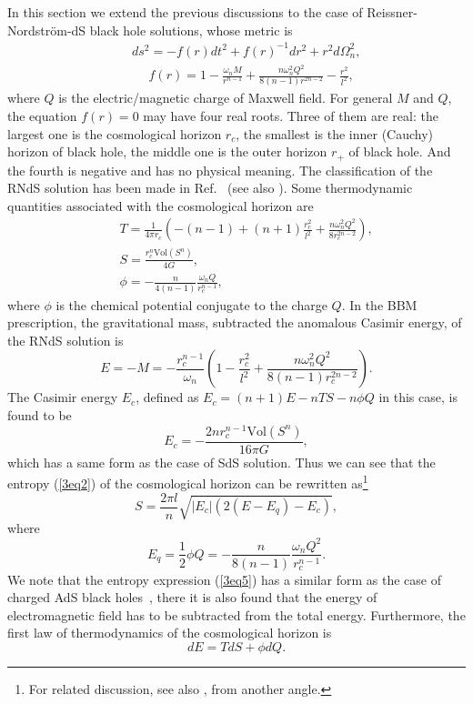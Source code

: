 \documentclass[a4paper,12pt]{article}
\begin{document}
In this section we extend the previous discussions to the case of Reissner-Nordstr\"om-dS
black hole solutions, whose metric is
\begin{eqnarray}
\label{3eq1}
&& ds^2 = -f(r) dt^2 +f(r)^{-1}dr^2 +r^2 d\Omega_n^2, \nonumber \\
&&~~~~~~ f(r)=1 -\frac{\omega_n M}{r^{n-1}} +\frac{n \omega_n^2 Q^2}{8(n-1) r^{2n-2}}
     -\frac{r^2}{l^2},
\end{eqnarray}
where $Q$ is the electric/magnetic charge of Maxwell field. For general $M$ and $Q$, the 
equation $f(r)=0$ may have four real roots. Three of them are real: the largest one is the 
cosmological horizon $r_c$,
the smallest is the inner (Cauchy) horizon of black hole, the middle one is the outer horizon
$r_+$ of black hole.  And the fourth is negative and has no physical meaning. The classification
of the RNdS solution has been made in Ref.~\cite{Roman} (see also \cite{CJS}). Some thermodynamic
quantities associated with the cosmological horizon are
\begin{eqnarray}
\label{3eq2}
&& T= \frac{1}{4\pi r_c} \left(-(n-1) +(n+1)\frac{r_c^2}{l^2}
    +\frac{n\omega_n^2 Q^2}{8 r_c^{2n-2}}\right), \nonumber \\
&& S =\frac{r_c^n\mbox{Vol}(S^n)}{4G}, \nonumber \\
&& \phi =-\frac{n}{4(n-1)}\frac{\omega_n Q}{r_c^{n-1}},
\end{eqnarray}
where $\phi$ is the chemical potential conjugate to the charge $Q$. In the BBM prescription,
the gravitational mass, subtracted the anomalous Casimir energy, of the RNdS solution is
\begin{equation}
\label{3eq3}
E=-M =-\frac{r_c^{n-1}}{\omega_n} \left (1 -\frac{r_c^2}{l^2} +
    \frac{n\omega_n^2 Q^2}{8(n-1)r_c^{2n-2}}\right).  
\end{equation}
The Casimir energy $E_c$, defined as $E_c =(n+1) E-nTS-n\phi Q$ in this case, is
found to be
\begin{equation}
\label{3eq4}
E_c=-\frac{2nr_c^{n-1}\mbox{Vol}(S^n)}{16\pi G},
\end{equation}
which has a same form as the case of SdS solution. Thus we can see that the entropy (\ref{3eq2})
of the cosmological horizon can be rewritten as\footnote{For related discussion, see 
also \cite{Med}, from another angle.}
\begin{equation}
\label{3eq5}
S=\frac{2\pi l}{n}\sqrt{|E_c|(2(E-E_q)-E_c)},
\end{equation}
where
\begin{equation}
E_q = \frac{1}{2}\phi Q =-\frac{n}{8(n-1)}\frac{\omega_n Q^2}{r_c^{n-1}}. 
\end{equation} 
We note that  the entropy expression (\ref{3eq5}) has a similar form as the case of
charged AdS black holes~\cite{Cai2}, there it is also found that the energy of electromagnetic
field has to be subtracted from the total energy. Furthermore, the first law of thermodynamics
of the cosmological horizon is
\begin{equation}
\label{3eq7}
dE =TdS +\phi dQ.
\end{equation}
\end{document}
